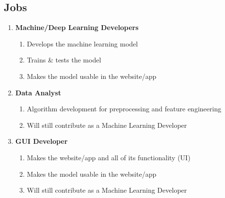 \documentclass{notes}
\begin{document}
\subsection{Jobs}
\begin{enumerate}
    \item \textbf{Machine/Deep Learning Developers}
    \begin{enumerate}
        \item Develops the machine learning model
        \item Trains \& tests the model
        \item Makes the model usable in the website/app
    \end{enumerate}
    \item \textbf{Data Analyst}
    \begin{enumerate}
        \item Algorithm development for preprocessing and feature engineering
        \item Will still contribute as a Machine Learning Developer
    \end{enumerate}
    \item \textbf{GUI Developer}
    \begin{enumerate}
        \item Makes the website/app and all of its functionality (UI)
        \item Makes the model usable in the website/app
        \item Will still contribute as a Machine Learning Developer
    \end{enumerate}
\end{enumerate}
\end{document}
